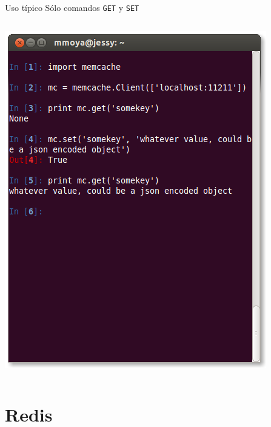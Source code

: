 \documentclass[spanish,xcolor=dvipsnames]{beamer}
\begin{document}
\begin{frame}{Uso típico}
  Sólo comandos \texttt{GET} y \texttt{SET}
  \begin{columns}
    \begin{column}{0.50\textwidth}
      \includegraphics[width=\linewidth]{images/memcache-interactive-session.png}
    \end{column}
    \pause
    \begin{column}{0.40\textwidth}
      \tiny
      
    \end{column}
  \end{columns}
\end{frame}

\section{Redis}
\end{document}

